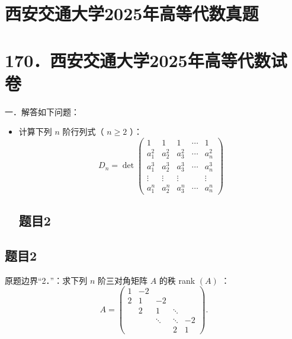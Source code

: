 \documentclass{article}
\begin{document}
\section*{西安交通大学2025年高等代数真题}
\section*{170．西安交通大学2025年高等代数试卷}
一．解答如下问题：

\begin{itemize}

\subsection{题目1}
  \item[1．] 计算下列 \(n\) 阶行列式（ \(n \geq 2\) ）：
\[
D_{n}=\operatorname{det}\left(\begin{array}{ccccc}
1 & 1 & 1 & \cdots & 1 \\
a_{1}^{2} & a_{2}^{2} & a_{3}^{2} & \cdots & a_{n}^{2} \\
a_{1}^{3} & a_{2}^{3} & a_{3}^{3} & \cdots & a_{n}^{3} \\
\vdots & \vdots & \vdots & & \vdots \\
a_{1}^{n} & a_{2}^{n} & a_{3}^{n} & \cdots & a_{n}^{n}
\end{array}\right)
\]

\subsection{题目2}
\end{itemize}

\subsection{题目2}
原题边界“2．”：求下列 \(n\) 阶三对角矩阵 \(A\) 的秩 rank \((A)\) ：
\[
A=\left(\begin{array}{ccccc}
1 & -2 & & & \\
2 & 1 & -2 & & \\
& 2 & 1 & \ddots & \\
& & \ddots & \ddots & -2 \\
& & & 2 & 1
\end{array}\right) .
\]
\end{document}
